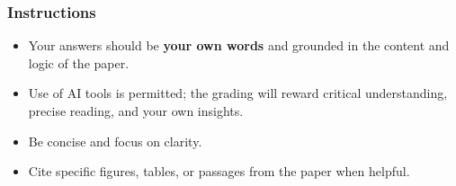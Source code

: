 \documentclass[12pt]{article}
\begin{document}
\subsubsection*{Instructions}

\begin{itemize}
    \item Your answers should be \textbf{your own words} and grounded in the content and logic of the paper.
    \item Use of AI tools is permitted; the grading will reward critical understanding, precise reading, and your own insights.
    \item Be concise and focus on clarity.
    \item Cite specific figures, tables, or passages from the paper when helpful.
\end{itemize}
\end{document}
